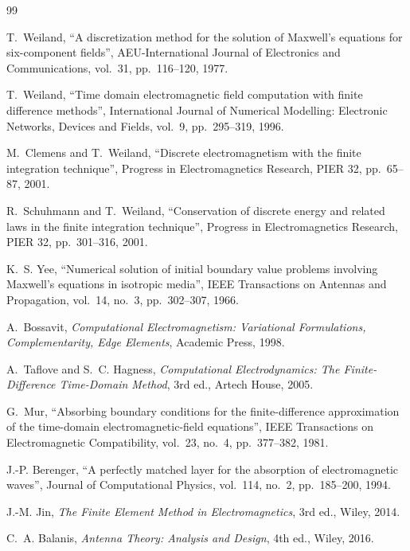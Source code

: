 \documentclass[11pt,a4paper]{article}
\begin{document}
\begin{thebibliography}{99}

 T.~Weiland, ``A discretization method for the solution of Maxwell's equations for
six-component fields'', AEU-International Journal of Electronics and Communications, vol.~31, pp.~116--120, 1977.

 T.~Weiland, ``Time domain electromagnetic field computation with finite difference
methods'', International Journal of Numerical Modelling: Electronic Networks, Devices and Fields, vol.~9,
pp.~295--319, 1996.

 M.~Clemens and T.~Weiland, ``Discrete electromagnetism with the finite integration
technique'', Progress in Electromagnetics Research, PIER 32, pp.~65--87, 2001.

 R.~Schuhmann and T.~Weiland, ``Conservation of discrete energy and related laws in the
finite integration technique'', Progress in Electromagnetics Research, PIER 32, pp.~301--316, 2001.

 K.~S. Yee, ``Numerical solution of initial boundary value problems involving Maxwell's
equations in isotropic media'', IEEE Transactions on Antennas and Propagation, vol.~14, no.~3, pp.~302--307,
1966.

 A.~Bossavit, \emph{Computational Electromagnetism: Variational Formulations,
Complementarity, Edge Elements}, Academic Press, 1998.

 A.~Taflove and S.~C. Hagness, \emph{Computational Electrodynamics: The Finite-Difference
Time-Domain Method}, 3rd ed., Artech House, 2005.

 G.~Mur, ``Absorbing boundary conditions for the finite-difference approximation of the
time-domain electromagnetic-field equations'', IEEE Transactions on Electromagnetic Compatibility, vol.~23,
no.~4, pp.~377--382, 1981.

 J.-P. Berenger, ``A perfectly matched layer for the absorption of electromagnetic
waves'', Journal of Computational Physics, vol.~114, no.~2, pp.~185--200, 1994.

 J.-M. Jin, \emph{The Finite Element Method in Electromagnetics}, 3rd ed., Wiley, 2014.

 C.~A. Balanis, \emph{Antenna Theory: Analysis and Design}, 4th ed., Wiley, 2016.

\end{thebibliography}
\end{document}
